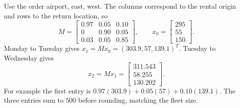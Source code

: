 Use the order airport, east, west. The columns correspond to the
rental origin and rows to the return location, so
\[
 M=\begin{bmatrix}0.97&0.05&0.10\\0&0.90&0.05\\0.03&0.05&0.85\end{bmatrix},
 \qquad x_0=\begin{bmatrix}295\\55\\150\end{bmatrix}.
\]
Monday to Tuesday gives $x_1=Mx_0=(303.9,57,139.1)^T$.
Tuesday to Wednesday gives
\[
 x_2=Mx_1=\begin{bmatrix}311.543\\58.255\\130.202\end{bmatrix}.
\]
For example the first entry is $0.97(303.9)+0.05(57)+0.10(139.1)$.
The three entries sum to $500$ before rounding, matching the fleet size.

